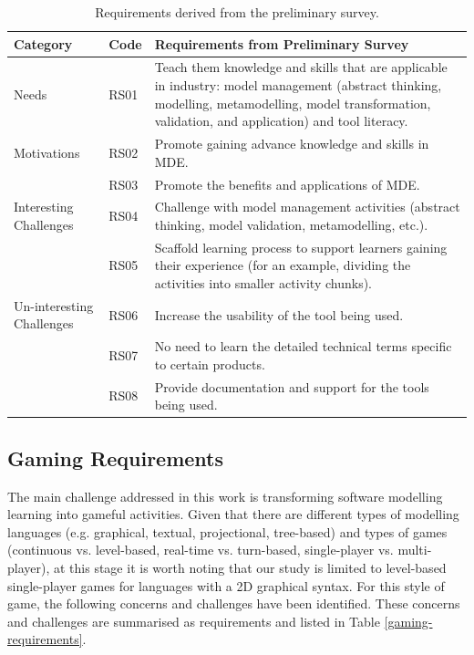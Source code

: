 \documentclass[10pt, a4paper]{report} \usepackage[titletoc]{appendix}
\begin{document}
\begin{table}[t!]
\caption{Requirements derived from the preliminary survey.}
\label{preliminary-survey}
\begin{center}
\begin{tabular}{ p{2cm}p{1cm}p{10cm} } 
\hline
Category & Code & Requirements from Preliminary Survey \\
\hline
\multirow{1}{2cm}{Needs} 
& RS01 & Teach them knowledge and skills that are applicable in industry: model management (abstract thinking, modelling, metamodelling, model transformation, validation, and application) and tool literacy. \\ 
\hline
\multirow{1}{2cm}{Motivations}
& RS02 & Promote gaining advance knowledge and skills in MDE. \\ 
& RS03 & Promote the benefits and applications of MDE. \\ 
\hline
\multirow{1}{2cm}{Interesting Challenges}
& RS04 & Challenge with model management activities (abstract thinking, model validation, metamodelling, etc.). \\ 
& RS05 & Scaffold learning process to support learners gaining their experience (for an example, dividing the activities into smaller activity chunks). \\ 
\hline
\multirow{1}{2cm}{Un-interesting Challenges}
& RS06 & Increase the usability of the tool being used. \\ 
& RS07 & No need to learn the detailed technical terms specific to certain products. \\ 
& RS08 & Provide documentation and support for the tools being used. \\ 
\hline
\end{tabular}
\end{center}
\end{table}


\subsection{Gaming Requirements}
\label{Gaming Requirements}
The main challenge addressed in this work is transforming software modelling learning into gameful activities. Given that there are different types of modelling languages (e.g. graphical, textual, projectional, tree-based) and types of games (continuous vs. level-based, real-time vs. turn-based, single-player vs. multi-player), at this stage it is worth noting that our study is limited to level-based single-player games for languages with a 2D graphical syntax. For this style of game, the following concerns and challenges have been identified. These concerns and challenges are summarised as requirements and listed in Table \ref{gaming-requirements}.
\end{document}
